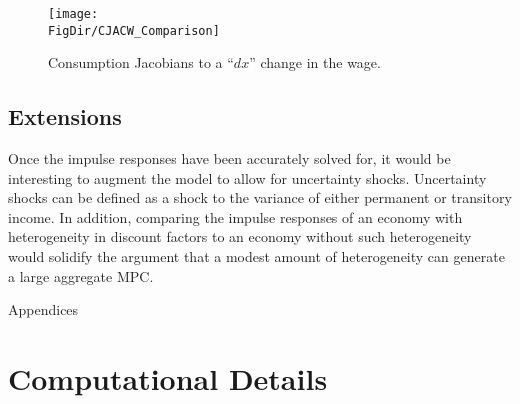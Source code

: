 \documentclass[titlepage]{\econtex}\providecommand{\texname}{FBS-NK}
\providecommand{\FigDir}{Figures}
\begin{document}
\begin{figure}{}
    \centering\texttt{[image: \\FigDir/CJACW\_Comparison]}
    \caption{Consumption Jacobians to a ``$dx$'' change in the wage.}
\end{figure}


\hypertarget{Extensions }{}
\subsection{Extensions }

Once the impulse responses have been accurately solved for, it would be interesting to augment the model to allow for uncertainty shocks. Uncertainty shocks can be defined as a shock to the variance of either permanent or transitory income. In addition, comparing the impulse responses of an economy with heterogeneity in discount factors to an economy without such heterogeneity would solidify the argument that a modest amount of heterogeneity can generate a large aggregate MPC. 
























\clearpage\vfill\eject

\appendix

\centerline{\LARGE Appendices}\vspace{0.2in}




\hypertarget{Computational Details}{}
\section{Computational Details}
\end{document}
